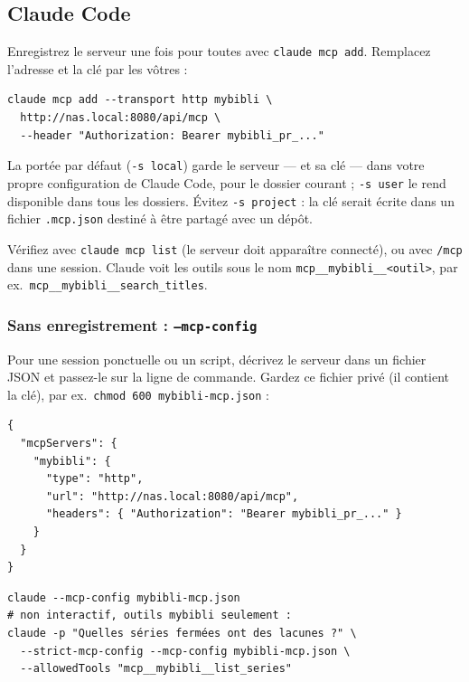 \subsection{Claude Code}
\label{sec:agents-claude-code}

Enregistrez le serveur une fois pour toutes avec \texttt{claude mcp
add}. Remplacez l'adresse et la clé par les vôtres :

\begin{lstlisting}
claude mcp add --transport http mybibli \
  http://nas.local:8080/api/mcp \
  --header "Authorization: Bearer mybibli_pr_..."
\end{lstlisting}

La portée par défaut (\texttt{-s local}) garde le serveur --- et sa
clé --- dans votre propre configuration de Claude Code, pour le
dossier courant ; \texttt{-s user} le rend disponible dans tous les
dossiers. Évitez \texttt{-s project} : la clé serait écrite dans un
fichier \texttt{.mcp.json} destiné à être partagé avec un dépôt.

Vérifiez avec \texttt{claude mcp list} (le serveur doit apparaître
connecté), ou avec \texttt{/mcp} dans une session. Claude voit les
outils sous le nom \texttt{mcp\_\_mybibli\_\_<outil>}, par ex.\
\texttt{mcp\_\_mybibli\_\_search\_titles}.

\subsubsection*{Sans enregistrement : \texttt{--mcp-config}}

Pour une session ponctuelle ou un script, décrivez le serveur dans un
fichier JSON et passez-le sur la ligne de commande. Gardez ce fichier
privé (il contient la clé), par ex.\ \texttt{chmod 600
mybibli-mcp.json} :

\begin{lstlisting}
{
  "mcpServers": {
    "mybibli": {
      "type": "http",
      "url": "http://nas.local:8080/api/mcp",
      "headers": { "Authorization": "Bearer mybibli_pr_..." }
    }
  }
}
\end{lstlisting}

\begin{lstlisting}
claude --mcp-config mybibli-mcp.json
# non interactif, outils mybibli seulement :
claude -p "Quelles séries fermées ont des lacunes ?" \
  --strict-mcp-config --mcp-config mybibli-mcp.json \
  --allowedTools "mcp__mybibli__list_series"
\end{lstlisting}

